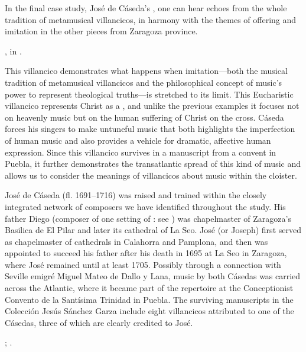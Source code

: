 In the final case study, José de Cáseda's , one can
hear echoes from the whole tradition of metamusical villancicos, in harmony
with the themes of offering and imitation in the other pieces from Zaragoza
province.%
\begin{Footnote} 
    , in \autocite[41--42, 153--192]{Cashner:WLSCM32}.
\end{Footnote}
This villancico demonstrates what happens when imitation---both the musical
tradition of metamusical villancicos and the philosophical concept of music's
power to represent theological truths---is stretched to its limit.
This Eucharistic villancico represents Christ as a , and unlike
the previous examples it focuses not on heavenly music but on the human
suffering of Christ on the cross.
Cáseda forces his singers to make untuneful music that both highlights the
imperfection of human music and also provides a vehicle for dramatic, affective
human expression. 
Since this villancico survives in a manuscript from a convent in Puebla, it
further demonstrates the transatlantic spread of this kind of music and allows
us to consider the meanings of villancicos about music within the cloister.


José de Cáseda (fl. 1691--1716) was raised and trained within the closely
integrated network of composers we have identified throughout the study.%
    \Autocites
    [120--121]{Calahorra:Zaragoza2}
    {Stevenson:CasedaD}
His father Diego (composer of one setting of : see
) was chapelmaster of Zaragoza's Basilica de El
Pilar and later its cathedral of La Seo.
José (or Joseph) first served as chapelmaster of cathedrals in Calahorra and
Pamplona, and then was appointed to succeed his father after his death in 1695
at La Seo in Zaragoza, where José remained until at least 1705.
Possibly through a connection with Seville emigré Miguel Mateo de Dallo y Lana,
music by both Cásedas was carried across the Atlantic, where it became part of
the repertoire at the Conceptionist Convento de la Santísima Trinidad in
Puebla.
The surviving manuscripts in the Colección Jesús Sánchez Garza include eight
villancicos attributed to one of the Cásedas, three of which are clearly
credited to José.%
\begin{Footnote}
    ;
    \autocite{Tello:SanchezGarzaCatalogo}.
\end{Footnote}


